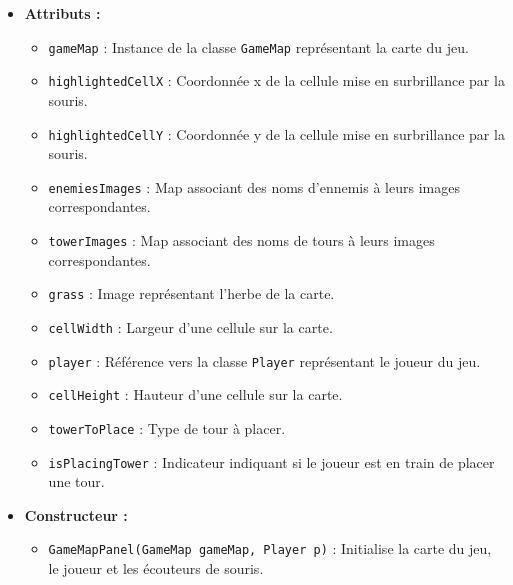 \documentclass{article}
\begin{document}
\begin{itemize}
\item \textbf{Attributs :}
\begin{itemize}
\item \texttt{gameMap} : Instance de la classe \texttt{GameMap} représentant la carte du jeu.
\item \texttt{highlightedCellX} : Coordonnée x de la cellule mise en surbrillance par la souris.
\item \texttt{highlightedCellY} : Coordonnée y de la cellule mise en surbrillance par la souris.
\item \texttt{enemiesImages} : Map associant des noms d'ennemis à leurs images correspondantes.
\item \texttt{towerImages} : Map associant des noms de tours à leurs images correspondantes.
\item \texttt{grass} : Image représentant l'herbe de la carte.
\item \texttt{cellWidth} : Largeur d'une cellule sur la carte.
\item \texttt{player} : Référence vers la classe \texttt{Player} représentant le joueur du jeu.
\item \texttt{cellHeight} : Hauteur d'une cellule sur la carte.
\item \texttt{towerToPlace} : Type de tour à placer.
\item \texttt{isPlacingTower} : Indicateur indiquant si le joueur est en train de placer une tour.
\end{itemize}

\item \textbf{Constructeur :}
\begin{itemize}
    \item \texttt{GameMapPanel(GameMap gameMap, Player p)} : Initialise la carte du jeu, le joueur et les écouteurs de souris.
\end{itemize}


\end{itemize}
\end{document}
